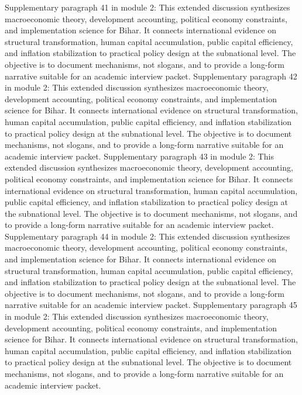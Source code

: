 \documentclass[preprint,12pt]{elsarticle}
\begin{document}
Supplementary paragraph 41 in module 2: This extended discussion synthesizes macroeconomic theory, development accounting, political economy constraints, and implementation science for Bihar. It connects international evidence on structural transformation, human capital accumulation, public capital efficiency, and inflation stabilization to practical policy design at the subnational level. The objective is to document mechanisms, not slogans, and to provide a long-form narrative suitable for an academic interview packet.
Supplementary paragraph 42 in module 2: This extended discussion synthesizes macroeconomic theory, development accounting, political economy constraints, and implementation science for Bihar. It connects international evidence on structural transformation, human capital accumulation, public capital efficiency, and inflation stabilization to practical policy design at the subnational level. The objective is to document mechanisms, not slogans, and to provide a long-form narrative suitable for an academic interview packet.
Supplementary paragraph 43 in module 2: This extended discussion synthesizes macroeconomic theory, development accounting, political economy constraints, and implementation science for Bihar. It connects international evidence on structural transformation, human capital accumulation, public capital efficiency, and inflation stabilization to practical policy design at the subnational level. The objective is to document mechanisms, not slogans, and to provide a long-form narrative suitable for an academic interview packet.
Supplementary paragraph 44 in module 2: This extended discussion synthesizes macroeconomic theory, development accounting, political economy constraints, and implementation science for Bihar. It connects international evidence on structural transformation, human capital accumulation, public capital efficiency, and inflation stabilization to practical policy design at the subnational level. The objective is to document mechanisms, not slogans, and to provide a long-form narrative suitable for an academic interview packet.
Supplementary paragraph 45 in module 2: This extended discussion synthesizes macroeconomic theory, development accounting, political economy constraints, and implementation science for Bihar. It connects international evidence on structural transformation, human capital accumulation, public capital efficiency, and inflation stabilization to practical policy design at the subnational level. The objective is to document mechanisms, not slogans, and to provide a long-form narrative suitable for an academic interview packet.
\end{document}
